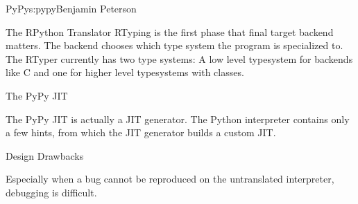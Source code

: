 \begin{aosachapter}{PyPy}{s:pypy}{Benjamin Peterson}
\begin{aosasect1}{The RPython Translator}
RTyping is the first phase that final target backend matters. The backend
chooses which type system the program is specialized to. The RTyper currently
has two type systems: A low level typesystem for backends like C and one for
higher level typesystems with classes.

\end{aosasect1}

\begin{aosasect1}{The PyPy JIT}

The PyPy JIT is actually a JIT generator. The Python interpreter contains only a
few hints, from which the JIT generator builds a custom JIT.

\end{aosasect1}

\begin{aosasect1}{Design Drawbacks}

Especially when a bug cannot be reproduced on the untranslated interpreter,
debugging is difficult.

\end{aosasect1}

\end{aosachapter}
